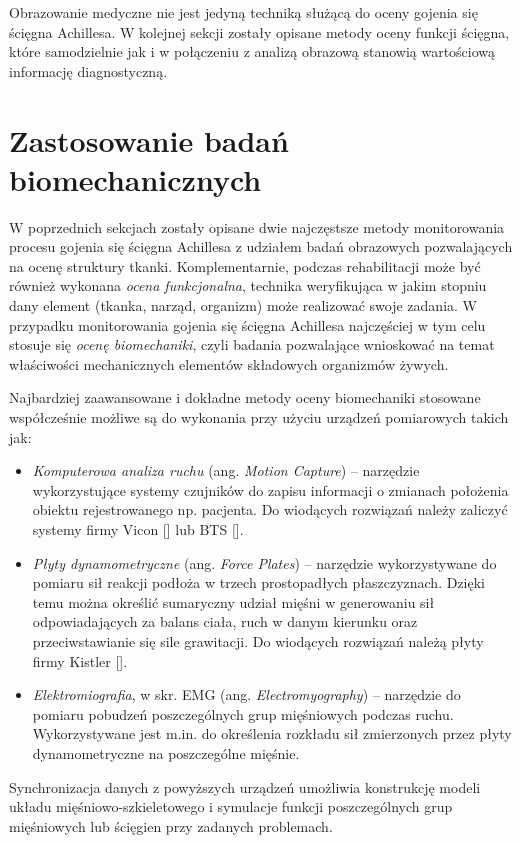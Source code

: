 Obrazowanie medyczne nie jest jedyną techniką służącą do oceny gojenia się ścięgna Achillesa. W kolejnej sekcji zostały opisane metody oceny funkcji ścięgna, które samodzielnie jak i w połączeniu z analizą obrazową stanowią wartościową informację diagnostyczną.

\section{Zastosowanie badań biomechanicznych}

W poprzednich sekcjach zostały opisane dwie najczęstsze metody monitorowania procesu gojenia się ścięgna Achillesa z udziałem badań obrazowych pozwalających na ocenę struktury tkanki. Komplementarnie, podczas rehabilitacji może być również wykonana \textit{ocena funkcjonalna}, technika weryfikująca w jakim stopniu dany element (tkanka, narząd, organizm) może realizować swoje zadania. W przypadku monitorowania gojenia się ścięgna Achillesa najczęściej w tym celu stosuje się \textit{ocenę biomechaniki}, czyli badania pozwalające wnioskować na temat właściwości mechanicznych elementów składowych organizmów żywych. 

Najbardziej zaawansowane i dokładne metody oceny biomechaniki stosowane współcześnie możliwe są do wykonania przy użyciu urządzeń pomiarowych takich jak:
\begin{itemize}
	\item \textit{Komputerowa analiza ruchu} (ang. \textit{Motion Capture}) -- narzędzie wykorzystujące systemy czujników do zapisu informacji o zmianach położenia obiektu rejestrowanego np. pacjenta. Do wiodących rozwiązań należy zaliczyć systemy firmy Vicon [] lub BTS [].
	\item \textit{Płyty dynamometryczne} (ang. \textit{Force Plates}) -- narzędzie wykorzystywane do pomiaru sił reakcji podłoża w trzech prostopadłych płaszczyznach. Dzięki temu można określić sumaryczny udział mięśni w generowaniu sił odpowiadających za balans ciała, ruch w danym kierunku oraz przeciwstawianie się sile grawitacji. Do wiodących rozwiązań należą płyty firmy Kistler [].
	\item \textit{Elektromiografia}, w skr. EMG (ang. \textit{Electromyography}) -- narzędzie do pomiaru pobudzeń poszczególnych grup mięśniowych podczas ruchu. Wykorzystywane jest m.in. do określenia rozkładu sił zmierzonych przez płyty dynamometryczne na poszczególne mięśnie.
\end{itemize}

Synchronizacja danych z powyższych urządzeń umożliwia konstrukcję modeli układu mięśniowo-szkieletowego i symulacje funkcji poszczególnych grup mięśniowych lub ścięgien przy zadanych problemach.

